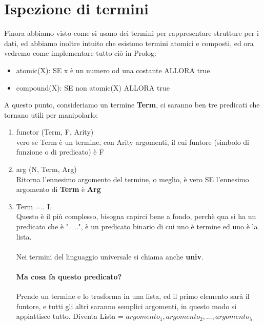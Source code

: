 \documentclass[12pt, a4paper, openany, oneside]{book}
\begin{document}
\section{Ispezione di termini}
Finora abbiamo visto come si usano dei termini per rappresentare strutture per i
dati, ed abbiamo inoltre intuito che esistono termini atomici e composti, ed 
ora vedremo come implementare tutto ciò in Prolog:
\begin{itemize}
	\item atomic(X): SE x è un numero od una costante ALLORA true
	\item compound(X): SE non atomic(X) ALLORA true
\end{itemize}
A questo punto, consideriamo un termine \textbf{Term}, ci saranno ben tre
predicati che tornano utili per manipolarlo:
\begin{enumerate}
	\item \color{red}functor \color{black} (Term, F, Arity)\\
	vero se Term è un termine, con Arity argomenti, il cui funtore (simbolo di 
	funzione o di predicato) è F
	\item \color{red}arg \color{black} (N, Term, Arg)\\
	Ritorna l'ennesimo argomento del termine, o meglio, è vero SE l'ennesimo 
	argomento di \textbf{Term} è \textbf{Arg}
	\item Term =.. L\\
	Questo è il più complesso, bisogna capirci bene a fondo, perchè qua si ha 
	un predicato che è "=..", è un predicato binario di cui uno è termine ed
	uno è la lista. \\ \\
	Nei termini del linguaggio universale si chiama anche \textbf{univ}. \\ 
	\paragraph{Ma cosa fa questo predicato?} Prende un termine e lo trasforma
	in una lista, ed il primo elemento sarà il funtore, e tutti gli altri 
	saranno semplici argomenti, in questo modo si appiattisce tutto. Diventa 
	Lista = $argomento_{1}, argomento_{2}, ..., argomento_{\lambda}$
\end{enumerate}
\end{document}
